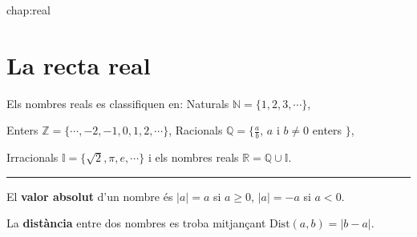 {chap:real}
 
\section{La recta real}

\begin{tip}
	Els nombres reals es classifiquen en: Naturals $\mathbb{N}=\{1,2,3,\cdots \}$, \par Enters $\mathbb{Z}=\{\cdots,-2,-1, 0, 1,2,\cdots \}$, Racionals $\mathbb{Q}=\{\frac{a}{b},\, a $ i $ b\neq 0 $ enters $  \}$, \par Irracionals $\mathbb{I}=\{\sqrt{2}, \pi, e, \cdots \}$ i els nombres reals  $\mathbb{R}=\mathbb{Q}\cup \mathbb{I}$.\par
		\rule{\textwidth}{1pt}
		
	El \textbf{valor absolut} d'un nombre és $|a|=a$ si $a\geq 0$, $|a|=-a$ si $a<0$.
	
	La \textbf{distància} entre dos nombres es troba mitjançant $\mathrm{Dist}(a,b)=|b-a|$. 

\end{tip}

